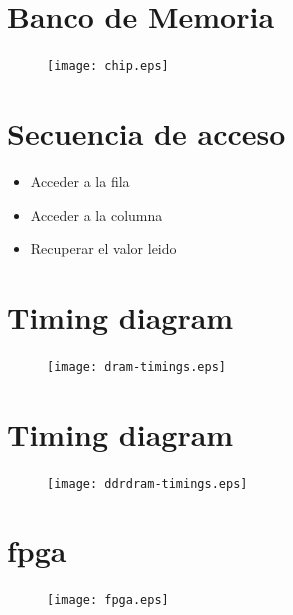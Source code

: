 \documentclass{beamer}
\begin{document}
\section{Banco de Memoria}
\begin{frame}
\begin{figure}[!htb]
\centering
\texttt{[image: chip.eps]}
\end{figure}
\end{frame}

\section{Secuencia de acceso}
\begin{frame}
	\begin{itemize}
		\item Acceder a la fila
		\item Acceder a la columna
		\item Recuperar el valor leido
	\end{itemize}
\end{frame}

\section{Timing diagram}
\begin{frame}
\begin{figure}[!htb]
\centering
\texttt{[image: dram-timings.eps]}
\end{figure}
\end{frame}

\section{Timing diagram}
\begin{frame}
\begin{figure}[!htb]
\centering
\texttt{[image: ddrdram-timings.eps]}
\end{figure}
\end{frame}

\section{fpga}
\begin{frame}
\begin{figure}[!htb]
\centering
\texttt{[image: fpga.eps]}
\end{figure}
\end{frame}
\end{document}
